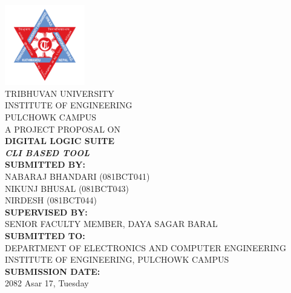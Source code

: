 \begin{titlepage}
    \begin{center}
        \includegraphics[width=3.5cm]{images/tuLogo.png} \\[0.8cm]

        {\large {TRIBHUVAN UNIVERSITY}} \\[0.2cm]
        {\normalsize {INSTITUTE OF ENGINEERING}} \\[0.2cm]
        {\normalsize {PULCHOWK CAMPUS}} \\[1cm]

        {\large {A PROJECT PROPOSAL ON}} \\[0.4cm]
        {\large \textbf{DIGITAL LOGIC SUITE}} \\[0.2cm]
        {\normalsize \textit{\textbf{CLI BASED TOOL}}} \\[1cm]

        {\normalsize \textbf{SUBMITTED BY:}} \\[0.2cm]
        {\normalsize NABARAJ BHANDARI (081BCT041)} \\[0.1cm]
        {\normalsize NIKUNJ BHUSAL (081BCT043)} \\[0.1cm]
        {\normalsize NIRDESH (081BCT044)} \\[0.8cm]

        {\normalsize \textbf{SUPERVISED BY:}} \\[0.2cm]
        {\normalsize SENIOR FACULTY MEMBER, DAYA SAGAR BARAL} \\[0.8cm]

        {\normalsize \textbf{SUBMITTED TO:}} \\[0.2cm]
        {\normalsize DEPARTMENT OF ELECTRONICS AND COMPUTER ENGINEERING} \\[0.2cm]
        {\normalsize INSTITUTE OF ENGINEERING, PULCHOWK CAMPUS} \\[1cm]

        {\normalsize \textbf{SUBMISSION DATE:}} \\[0.2cm]
        {\normalsize 2082 Asar 17, Tuesday}
    \end{center}
\end{titlepage}